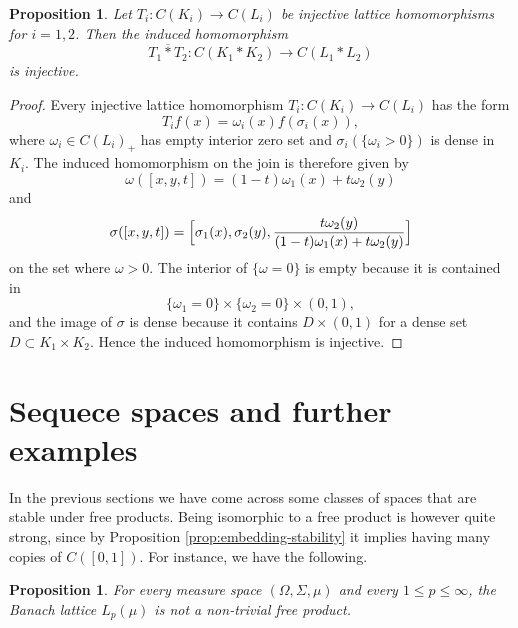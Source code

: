 \documentclass[12pt]{amsart}
\theoremstyle{plain}
\newtheorem{proposition}[theorem]{Proposition}
\theoremstyle{definition}
\begin{document}
\begin{proposition}
Let $T_i:C(K_i)\to C(L_i)$ be injective lattice homomorphisms for $i=1,2$. Then the induced homomorphism
\[
T_1\overline{\ast}T_2:C(K_1\ast K_2)\to C(L_1\ast L_2)
\]
is injective.
\end{proposition}

\begin{proof}
Every injective lattice homomorphism $T_i:C(K_i)\to C(L_i)$ has the form
\[
T_if(x)=\omega_i(x)f(\sigma_i(x)),
\]
where $\omega_i\in C(L_i)_+$ has empty interior zero set and $\sigma_i(\{\omega_i>0\})$ is dense in $K_i$. The induced homomorphism on the join is therefore given by
\[
\omega([x,y,t])=(1-t)\omega_1(x)+t\omega_2(y)
\]
and
\[
\sigma([x,y,t])=
\Bigl[\sigma_1(x),\sigma_2(y),\frac{t\omega_2(y)}{(1-t)\omega_1(x)+t\omega_2(y)}\Bigr]
\]
on the set where $\omega>0$. The interior of $\{\omega=0\}$ is empty because it is contained in
\[
\{\omega_1=0\}\times \{\omega_2=0\}\times (0,1),
\]
and the image of $\sigma$ is dense because it contains $D\times (0,1)$ for a dense set $D\subset K_1\times K_2$. Hence the induced homomorphism is injective.
\end{proof}

\section{Sequece spaces and further examples}
In the previous sections we have come across some classes of spaces that are stable under free products. Being isomorphic to a free product is however quite strong, since by Proposition \ref{prop:embedding-stability} it implies having many copies of $C([0,1])$. For instance, we have the following.
\begin{proposition}
For every measure space $(\Omega,\Sigma,\mu)$ and every $1\leq p\leq \infty$, the Banach lattice $L_p(\mu)$ is not a non-trivial free product.
\end{proposition}
\end{document}
